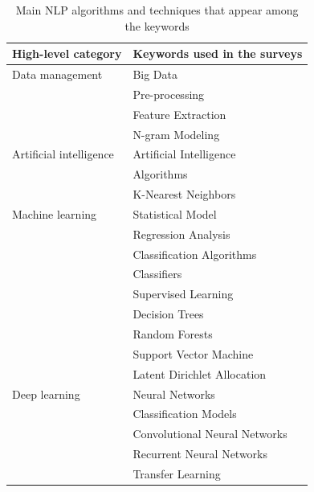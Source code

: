 \begin{table}[htp]
    \centering
    \tabulinesep=1.2mm
    \caption{Main NLP algorithms and techniques that appear among the keywords}
    \begin{tabu}{X[r]X[l]}
        High-level category     & Keywords used in the surveys  \\
        \toprule
        Data management         & Big Data                      \\
                                & Pre-processing                \\
                                & Feature Extraction            \\
                                & N-gram Modeling               \\
        Artificial intelligence & Artificial Intelligence       \\
                                & Algorithms                    \\
                                & K-Nearest Neighbors           \\
        Machine learning        & Statistical Model             \\
                                & Regression Analysis           \\
                                & Classification Algorithms     \\
                                & Classifiers                   \\
                                & Supervised Learning           \\
                                & Decision Trees                \\
                                & Random Forests                \\
                                & Support Vector Machine        \\
                                & Latent Dirichlet Allocation   \\
        Deep learning           & Neural Networks               \\
                                & Classification Models         \\
                                & Convolutional Neural Networks \\
                                & Recurrent Neural Networks     \\
                                & Transfer Learning             \\
        \bottomrule
    \end{tabu}
    \label{table:nlp-tools}
\end{table}

